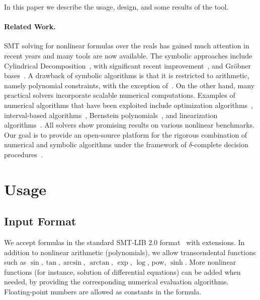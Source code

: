 \documentclass[envcountsect]{llncs}
\begin{document}
In this paper we describe the usage, design, and some results of the tool.

\paragraph{Related Work.} 

SMT solving for nonlinear formulas over the reals has gained much attention in recent years and many tools are now available. The symbolic approaches include Cylindrical Decomposition~\cite{collins}, with significant recent improvement~\cite{PassmoreJ09,DBLP:conf/cade/JovanovicM12}, and Gr\"obner bases~\cite{PlatzerQR09}. A drawback of symbolic algorithms is that it is restricted to arithmetic, namely polynomial constraints, with the exception of~\cite{metitarski}. On the other hand, many practical solvers incorporate scalable numerical computations. Examples of numerical algorithms that have been exploited include optimization algorithms~\cite{BorrallerasLNRR09,DBLP:conf/fmcad/NuzzoPSS10}, interval-based algorithms~\cite{HySAT,DBLP:conf/atva/EggersFH08,DBLP:conf/fmcad/Gao10}, Bernstein polynomials~\cite{bern}, and linearization algorithms~\cite{cordic}. All solvers show promising results on various nonlinear benchmarks. Our goal is to provide an open-source platform for the rigorous combination of numerical and symbolic algorithms under the framework of $\delta$-complete decision procedures~\cite{DBLP:conf/cade/GaoAC12}. 

\section{Usage}

\subsection{Input Format}

We accept formulas in the standard SMT-LIB 2.0 format~\cite{BarST-SMT-10} with extensions. In addition to nonlinear arithmetic (polynomials), we allow transcendental functions such as $\sin, \tan, \arcsin$, $\arctan$, $\exp$, $\log$, pow, $\sinh$. More nonlinear functions (for instance, solution of differential equations) can be added when needed, by providing the corresponding numerical evaluation algorithms. Floating-point numbers are allowed as constants in the formula. 
\end{document}
